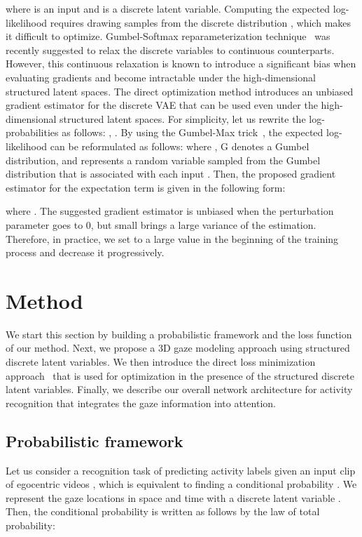 \documentclass[10pt,twocolumn,letterpaper]{article}
\begin{document}
where  is an input and  is a discrete latent variable. Computing the expected log-likelihood requires drawing samples from the discrete distribution , which makes it difficult to optimize. Gumbel-Softmax reparameterization technique~\cite{jang2016categorical,maddison2016concrete} was recently suggested to relax the discrete variables to continuous counterparts. However, this continuous relaxation is known to introduce a significant bias when evaluating gradients and become intractable under the high-dimensional structured latent spaces. The direct optimization method introduces an unbiased gradient estimator for the discrete VAE that can be used even under the high-dimensional structured latent spaces. For simplicity, let us rewrite the log-probabilities as follows: , . By using the Gumbel-Max trick~\cite{maddison2014sampling}, the expected log-likelihood can be reformulated as follows:  where , G denotes a Gumbel distribution, and  represents a random variable sampled from the Gumbel distribution that is associated with each input . Then, the proposed gradient estimator for the expectation term is given in the following form:

where . The suggested gradient estimator is unbiased when the perturbation parameter  goes to 0, but small  brings a large variance of the estimation. Therefore, in practice, we set  to a large value in the beginning of the training process and decrease it progressively.

\section{Method} \label{sec:method}
We start this section by building a probabilistic framework and the loss function of our method. Next, we propose a 3D gaze modeling approach using structured discrete latent variables. We then introduce the direct loss minimization approach~\cite{lorberbom2018direct} that is used for optimization in the presence of the structured discrete latent variables. Finally, we describe our overall network architecture for activity recognition that integrates the gaze information into attention.

\subsection{Probabilistic framework} \label{subsec:framework}
Let us consider a recognition task of predicting activity labels  given an input clip of egocentric videos , which is equivalent to finding a conditional probability . We represent the gaze locations in space and time with a discrete latent variable . Then, the conditional probability is written as follows by the law of total probability:
\end{document}
